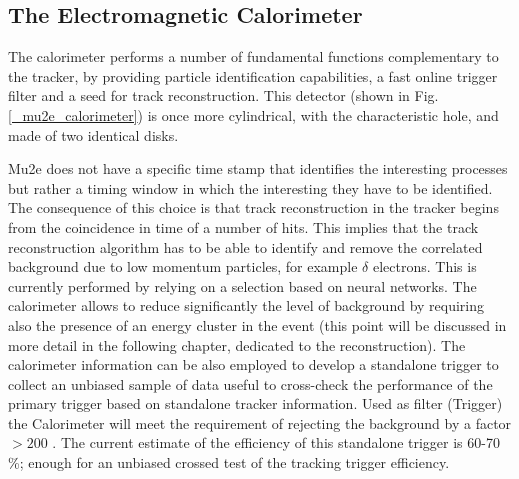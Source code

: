 \documentclass[12pt,a4paper,openright, oneside, titlepage]{book} %
\begin{document}
\subsection{The Electromagnetic Calorimeter}
The calorimeter performs a number of fundamental functions complementary to the tracker, by providing particle identification capabilities, a fast online trigger filter and a seed for track reconstruction.
This detector (shown in Fig. \ref{_mu2e_calorimeter}) is once more cylindrical, with the characteristic hole, and made of two identical disks.

\noindent
Mu2e does not have a specific time stamp that identifies the interesting processes but rather a timing window in which the interesting they have to be identified. 
The consequence of this choice is that track reconstruction in the tracker begins from the coincidence in time of a number of hits. 
This implies that the track reconstruction algorithm has to be able to identify and remove the correlated background due to low momentum particles, for example $\delta$ electrons. 
This is currently performed by relying on a selection based on neural networks.
The calorimeter allows to reduce significantly the level of background by requiring also the presence of an energy cluster in the event (this point will be discussed in more detail in the following chapter, dedicated to the reconstruction).
The calorimeter information can be also employed to develop a standalone trigger to collect an unbiased sample of data useful to cross-check the performance of the primary trigger based on standalone tracker information.
Used as filter (Trigger) the Calorimeter will meet the requirement of rejecting the background by a factor $>200$ \cite{Calorimeter:2018}\cite{Donghia:2019}. The current estimate of the efficiency of this standalone trigger is 60-70 \%; enough for an unbiased crossed test of the tracking trigger efficiency.\\ 
\end{document}

